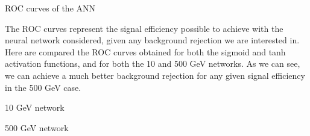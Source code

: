 \documentclass[8 pt]{beamer}
\begin{document}
\begin{frame}{ROC curves of the ANN}

	\justifying
 The ROC curves represent the signal efficiency possible to achieve with the neural network considered, given any background rejection we are interested in. Here are compared the ROC curves obtained for both the sigmoid and tanh activation functions, and for both the 10 and 500 GeV networks. As we can see, we can achieve a much better background rejection for any given signal efficiency in the 500 GeV case. \vfill

   \begin{minipage}[c]{.48\linewidth}
       \begin{exampleblock}{} { \begin{center} 10 GeV network \end{center}} \end{exampleblock} \vspace{10pt}
   \end{minipage} \hfill
   \hspace{4pt}
   \begin{minipage}[c]{.48\linewidth}
   	\begin{exampleblock}{} {\begin{center} 500 GeV network \end{center}} \end{exampleblock} \vspace{10pt}
   \end{minipage} \hfill \vfill
	
\end{frame}
\end{document}
